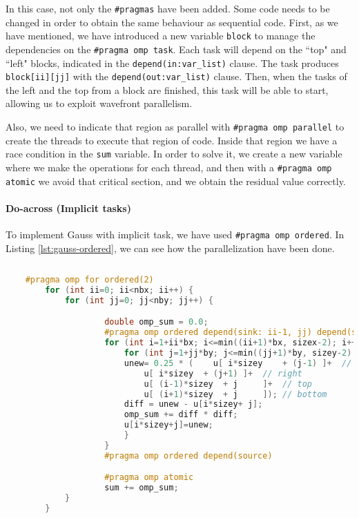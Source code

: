 \documentclass[a4paper, 10pt]{article}
\begin{document}
  In this case, not only the \texttt{\#pragmas} have been added. Some code needs to be changed in order to obtain the same behaviour as sequential code. First, as we have mentioned, we have introduced a new variable \texttt{block} to manage the dependencies on the \texttt{\#pragma omp task}. Each task will depend on the ``top" and ``left" blocks, indicated in the \texttt{depend(in:var\_list)} clause. The task produces \texttt{block[ii][jj]} with the \texttt{depend(out:var\_list)} clause. Then, when the tasks of the left and the top from a block are finished, this task will be able to start, allowing us to exploit wavefront parallelism.

  Also, we need to indicate that region as parallel with \texttt{\#pragma omp parallel} to create the threads to execute that region of code. Inside that region we have a race condition in the \texttt{sum} variable. In order to solve it, we create a new variable where we make the operations for each thread, and then with a \texttt{\#pragma omp atomic} we avoid that critical section, and we obtain the residual value correctly.

\clearpage
\paragraph{Do-across (Implicit tasks)\\}


To implement Gauss with implicit task, we have used \texttt{\#pragma omp ordered}. In Listing \ref{lst:gauss-ordered}, we can see how the parallelization have been done.

\begin{lstlisting}[language=c, caption={OpenMP pragma for Gauss-Seidel parallelization}, label={lst:gauss-ordered}]
    
    #pragma omp for ordered(2)
        for (int ii=0; ii<nbx; ii++) {
            for (int jj=0; jj<nby; jj++) {

                    double omp_sum = 0.0;
                    #pragma omp ordered depend(sink: ii-1, jj) depend(sink: ii, jj-1)
                    for (int i=1+ii*bx; i<=min((ii+1)*bx, sizex-2); i++) {
                        for (int j=1+jj*by; j<=min((jj+1)*by, sizey-2); j++) {
                        unew= 0.25 * (    u[ i*sizey	+ (j-1) ]+  // left
                            u[ i*sizey	+ (j+1) ]+  // right
                            u[ (i-1)*sizey	+ j     ]+  // top
                            u[ (i+1)*sizey	+ j     ]); // bottom
                        diff = unew - u[i*sizey+ j];
                        omp_sum += diff * diff; 
                        u[i*sizey+j]=unew;
                        } 
                    }
                    #pragma omp ordered depend(source)

                    #pragma omp atomic
                    sum += omp_sum;
            }
        }
    
    \end{lstlisting}
\end{document}
